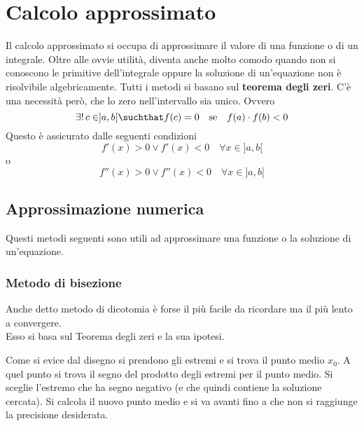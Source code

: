 
\section{Calcolo approssimato}
Il calcolo approssimato si occupa di approssimare il valore di una funzione o di un integrale. Oltre
alle ovvie utilità, diventa anche molto comodo quando non si conoscono le primitive dell'integrale
oppure la soluzione di un'equazione non è risolvibile algebricamente. Tutti i metodi si basano sul
\textbf{teorema degli zeri}. C'è una necessità però, che lo zero nell'intervallo sia unico. Ovvero
\begin{equation*}
  \exists!\,c\in]a,b[\suchthat f(c)=0\quad\text{se}\quad f(a)\cdot f(b) < 0
\end{equation*}
Questo è assicurato dalle seguenti condizioni
\begin{equation*}
  f'(x)>0\lor f'(x)<0\quad\forall x\in]a,b[
\end{equation*}
o
\begin{equation*}
  f''(x)>0\lor f''(x)<0\quad\forall x\in]a,b[
\end{equation*}

\subsection{Approssimazione numerica}
Questi metodi seguenti sono utili ad approssimare una funzione o la soluzione di un'equazione.

\subsubsection{Metodo di bisezione}
Anche detto metodo di dicotomia è forse il più facile da ricordare ma il più lento a convergere.\\
Esso si basa sul Teorema degli zeri e la sua ipotesi.
\begin{center}
\end{center}
Come si evice dal disegno si prendono gli estremi e si trova il punto medio $x_0$. A quel punto
si trova il segno del prodotto degli estremi per il punto medio. Si sceglie l'estremo che ha segno
negativo (e che quindi contiene la soluzione cercata). Si calcola il nuovo punto medio e si va
avanti fino a che non si raggiunge la precisione desiderata.

